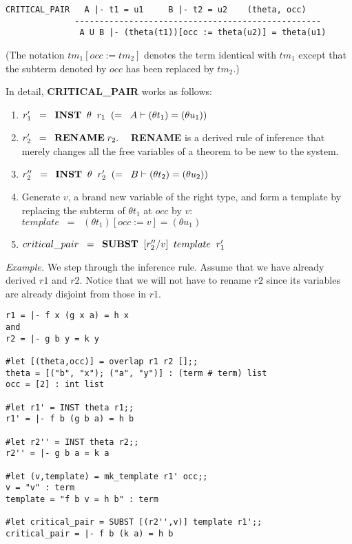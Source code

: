 \begin{verbatim}
CRITICAL_PAIR   A |- t1 = u1     B |- t2 = u2    (theta, occ)
              --------------------------------------------------
               A U B |- (theta(t1))[occ := theta(u2)] = theta(u1)
\end{verbatim}
(The notation $tm_1 [ occ := tm_2 ]$ denotes the term identical with $tm_1$
except that the subterm denoted by $occ$ has been replaced by $tm_2$.)

In detail, {\bf CRITICAL\_PAIR} works as follows:
\begin{enumerate}
\item $r'_1\;\; = \;\;{\bf INST} \;\; \theta \;\; r_1 \;\;(=\;\;A \vdash
(\theta t_1) =(\theta u_1))$
\item $r'_2 \;\; =\;\; {\bf RENAME} \;r_2.\;\;\;$ {\bf RENAME} is a derived rule of
inference that merely changes all the free variables of a theorem to be new to
the system.
\item $r''_2 \;\; = \;\; {\bf INST} \;\; \theta \;\;r'_2 \;\;(=\;\;B
\vdash(\theta t_2) = (\theta u_2))$
\item Generate $v$, a brand new variable of the right type, and form
a template by replacing the subterm of $\theta t_1$ at $occ$ by $v$:  $template \;\;
= \;\;(\theta t_1)[occ := v] = (\theta u_1)$ 
\item $critical\_pair \;\; = \;\; {\bf SUBST}\;\;[r''_2/v]\;\;template\;\;r'_1$
\end{enumerate}

{\em Example. \cite{huet80}} We step through the inference rule. Assume that we have
already derived $r1$ and $r2$. Notice that we will not have to rename $r2$
since its variables are already disjoint from those in $r1$.

\begin{verbatim}
r1 = |- f x (g x a) = h x  
and
r2 = |- g b y = k y

#let [(theta,occ)] = overlap r1 r2 [];;
theta = [("b", "x"); ("a", "y")] : (term # term) list
occ = [2] : int list

#let r1' = INST theta r1;;
r1' = |- f b (g b a) = h b

#let r2'' = INST theta r2;;
r2'' = |- g b a = k a

#let (v,template) = mk_template r1' occ;;
v = "v" : term
template = "f b v = h b" : term

#let critical_pair = SUBST [(r2'',v)] template r1';;
critical_pair = |- f b (k a) = h b
\end{verbatim}

